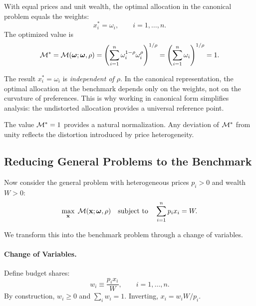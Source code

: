 \begin{proposition}
\label{prop:benchmark}
With equal prices and unit wealth, the optimal allocation in the canonical problem equals the weights:
\begin{equation}
\label{eq:benchmark-solution}
x_i^* = \omega_i, \qquad i = 1, \ldots, n.
\end{equation}
The optimized value is
\begin{equation}
\label{eq:benchmark-value}
\mathcal{M}^* = \mathcal{M}(\boldsymbol{\omega}; \boldsymbol{\omega}, \rho) = \left( \sum_{i=1}^{n} \omega_i^{1-\rho} \omega_i^\rho \right)^{1/\rho} = \left( \sum_{i=1}^{n} \omega_i \right)^{1/\rho} = 1.
\end{equation}
\end{proposition}

\begin{calloutnote}
The result $x_i^* = \omega_i$ is \emph{independent of $\rho$}. In the canonical representation, the optimal allocation at the benchmark depends only on the weights, not on the curvature of preferences. This is why working in canonical form simplifies analysis: the undistorted allocation provides a universal reference point.

The value $\mathcal{M}^* = 1$ provides a natural normalization. Any deviation of $\mathcal{M}^*$ from unity reflects the distortion introduced by price heterogeneity.
\end{calloutnote}

\subsection{Reducing General Problems to the Benchmark}
\label{subsec:reduction}

Now consider the general problem with heterogeneous prices $p_i > 0$ and wealth $W > 0$:
\begin{equation}
\label{eq:general-problem}
\max_{\mathbf{x}} \; \mathcal{M}(\mathbf{x}; \boldsymbol{\omega}, \rho) \quad \text{subject to} \quad \sum_{i=1}^{n} p_i x_i = W.
\end{equation}

We transform this into the benchmark problem through a change of variables.

\paragraph{Change of Variables.}
Define budget shares:
\begin{equation}
\label{eq:budget-share-def}
w_i \equiv \frac{p_i x_i}{W}, \qquad i = 1, \ldots, n.
\end{equation}
By construction, $w_i \geq 0$ and $\sum_i w_i = 1$. Inverting, $x_i = w_i W / p_i$.

